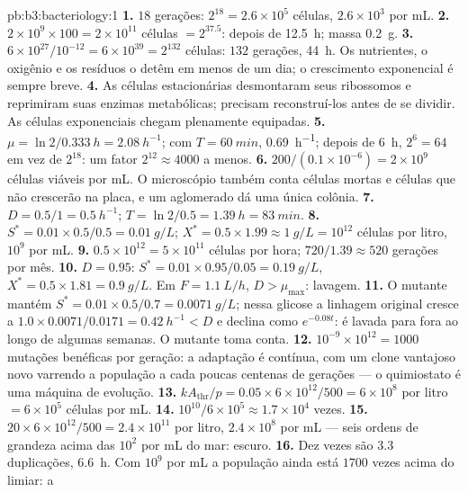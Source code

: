 \begin{solution}{pb:b3:bacteriology:1}
\textbf{1.} $18$ gerações: $2^{18} = 2.6\times 10^{5}$ células,
$2.6\times 10^{3}$ por mL.
\textbf{2.} $2\times 10^{9}\times 100 = 2\times 10^{11}$ células $=
2^{37.5}$: depois de \qty{12.5}{h}; massa \qty{0.2}{g}.
\textbf{3.} $6\times 10^{27}/10^{-12} = 6\times 10^{39} = 2^{132}$
células: $132$ gerações, \qty{44}{h}. Os nutrientes, o oxigênio e os
resíduos o detêm em menos de um dia; o crescimento exponencial é sempre
breve.
\textbf{4.} As células estacionárias desmontaram seus ribossomos e
reprimiram suas enzimas metabólicas; precisam reconstruí-los antes de
se dividir. As células exponenciais chegam plenamente equipadas.
\textbf{5.} $\mu = \ln 2/\qty{0.333}{h} = \qty{2.08}{h^{-1}}$; com
$T =
\qty{60}{min}$, \qty{0.69}{h^{-1}}; depois de \qty{6}{h},
$2^{6} = 64$ em vez de $2^{18}$: um fator $2^{12} \approx 4000$ a
menos.
\textbf{6.} $200/(0.1\times 10^{-6}) = 2\times 10^{9}$ células viáveis
por mL. O microscópio também conta células mortas e células que não
crescerão na placa, e um aglomerado dá uma única colônia.
\textbf{7.} $D = 0.5/1 = \qty{0.5}{h^{-1}}$; $T = \ln 2/0.5 =
\qty{1.39}{h} = \qty{83}{min}$.
\textbf{8.} $S^{*} = 0.01\times 0.5/0.5 = \qty{0.01}{g/L}$; $X^{*} =
0.5\times 1.99 \approx \qty{1}{g/L} = 10^{12}$ células por litro,
$10^{9}$ por mL.
\textbf{9.} $0.5\times 10^{12} = 5\times 10^{11}$ células por hora;
$720/1.39
\approx 520$ gerações por mês.
\textbf{10.} $D = 0.95$: $S^{*} = 0.01\times 0.95/0.05 = \qty{0.19}{g/L}$, $X^{*} = 0.5\times 1.81 = \qty{0.9}{g/L}$. Em
$F = \qty{1.1}{L/h}$, $D
> \mu_{\max}$: lavagem.
\textbf{11.} O mutante mantém $S^{*} = 0.01\times 0.5/0.7 = \qty{0.0071}{g/L}$;
nessa glicose a linhagem original cresce a $1.0\times 0.0071/0.0171 =
\qty{0.42}{h^{-1}} < D$ e declina como $e^{-0.08t}$: é lavada para fora
ao longo de algumas semanas. O mutante toma conta.
\textbf{12.} $10^{-9}\times 10^{12} = 1000$ mutações benéficas por
geração: a adaptação é contínua, com um clone vantajoso novo varrendo a
população a cada poucas centenas de gerações --- o quimiostato é uma
máquina de evolução.
\textbf{13.} $kA_{\text{thr}}/p = 0.05\times 6\times 10^{12}/500 =
6\times 10^{8}$ por litro $= 6\times 10^{5}$ células por mL.
\textbf{14.} $10^{10}/6\times 10^{5} \approx 1.7\times 10^{4}$ vezes.
\textbf{15.} $20\times 6\times 10^{12}/500 = 2.4\times 10^{11}$ por
litro, $2.4\times 10^{8}$ por mL --- seis ordens de grandeza acima das
$10^{2}$ por mL do mar: escuro.
\textbf{16.} Dez vezes são $3.3$ duplicações, \qty{6.6}{h}. Com
$10^{9}$ por mL a população ainda está $1700$ vezes acima do limiar: a

\end{solution}
